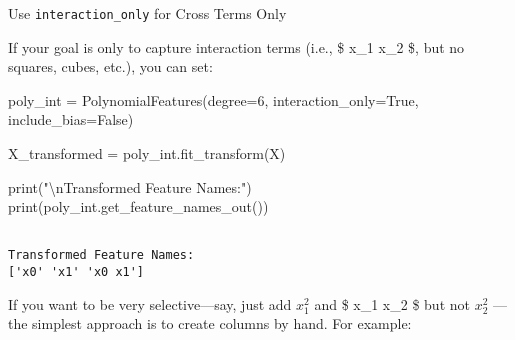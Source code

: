 \documentclass[
  letterpaper,
  DIV=11,
  numbers=noendperiod]{scrreprt}
\newenvironment{Shaded}{\begin{snugshade}}{\end{snugshade}}
\newcommand{\BuiltInTok}[1]{\textcolor[rgb]{0.00,0.23,0.31}{#1}}
\newcommand{\CharTok}[1]{\textcolor[rgb]{0.13,0.47,0.30}{#1}}
\newcommand{\DecValTok}[1]{\textcolor[rgb]{0.68,0.00,0.00}{#1}}
\newcommand{\NormalTok}[1]{\textcolor[rgb]{0.00,0.23,0.31}{#1}}
\newcommand{\OperatorTok}[1]{\textcolor[rgb]{0.37,0.37,0.37}{#1}}
\newcommand{\StringTok}[1]{\textcolor[rgb]{0.13,0.47,0.30}{#1}}
\newcommand{\VariableTok}[1]{\textcolor[rgb]{0.07,0.07,0.07}{#1}}
\begin{document}
Use \texttt{interaction\_only} for Cross Terms Only

If your goal is only to capture interaction terms (i.e., \$ x\_1
\times x\_2 \$, but no squares, cubes, etc.), you can set:

\begin{Shaded}
\begin{Highlighting}[]
\NormalTok{poly\_int }\OperatorTok{=}\NormalTok{ PolynomialFeatures(degree}\OperatorTok{=}\DecValTok{6}\NormalTok{, }
\NormalTok{                             interaction\_only}\OperatorTok{=}\VariableTok{True}\NormalTok{, }
\NormalTok{                             include\_bias}\OperatorTok{=}\VariableTok{False}\NormalTok{)}

\NormalTok{X\_transformed }\OperatorTok{=}\NormalTok{ poly\_int.fit\_transform(X)}

\BuiltInTok{print}\NormalTok{(}\StringTok{"}\CharTok{\textbackslash{}n}\StringTok{Transformed Feature Names:"}\NormalTok{)}
\BuiltInTok{print}\NormalTok{(poly\_int.get\_feature\_names\_out())}
\end{Highlighting}
\end{Shaded}

\begin{verbatim}

Transformed Feature Names:
['x0' 'x1' 'x0 x1']
\end{verbatim}

If you want to be very selective---say, just add \(x_1^2\) and \$ x\_1
\times x\_2 \$ but not \(x_2^2\) ---the simplest approach is to create
columns by hand. For example:
\end{document}
